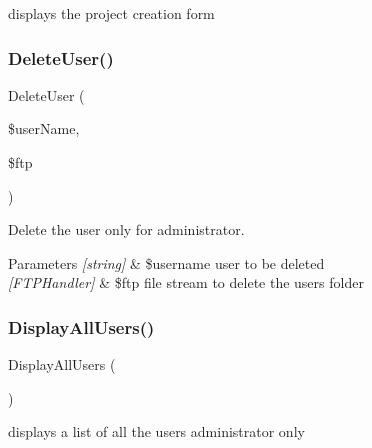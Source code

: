 displays the project creation form 

\mbox{\label{class_user_controller_a9b7339490577e5e6f88a27de62076b4f}} 
\subsubsection{\texorpdfstring{Delete\+User()}{DeleteUser()}}
{\footnotesize\ttfamily Delete\+User (\begin{DoxyParamCaption}\item[{}]{\$user\+Name,  }\item[{}]{\$ftp }\end{DoxyParamCaption})}



Delete the user only for administrator. 


\begin{DoxyParams}{Parameters}
{\em \mbox{[}string\mbox{]}} & \$username user to be deleted \\
\hline
{\em \mbox{[}\+F\+T\+P\+Handler\mbox{]}} & \$ftp file stream to delete the user\textquotesingle{}s folder \\
\hline
\end{DoxyParams}
\mbox{\label{class_user_controller_a40926bab092ae93f54e313aed4e8808a}} 
\subsubsection{\texorpdfstring{Display\+All\+Users()}{DisplayAllUsers()}}
{\footnotesize\ttfamily Display\+All\+Users (\begin{DoxyParamCaption}{ }\end{DoxyParamCaption})}



displays a list of all the users administrator only 

\mbox{\label{class_user_controller_a805199e1912e0733984fba3f6f0f2bed}} 
